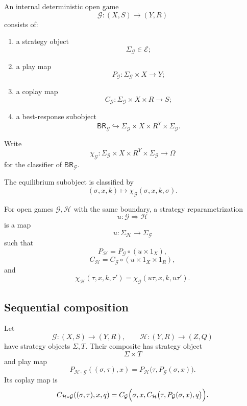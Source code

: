 \begin{definition}
\label{def:internal-deterministic-open-game}
An internal deterministic open game
\[
  \mathcal G:(X,S)\longrightarrow(Y,R)
\]
consists of:
\begin{enumerate}
  \item a strategy object
  \[
    \Sigma_{\mathcal G}\in\mathcal E;
  \]
  \item a play map
  \[
    P_{\mathcal G}:
    \Sigma_{\mathcal G}\times X\to Y;
  \]
  \item a coplay map
  \[
    C_{\mathcal G}:
    \Sigma_{\mathcal G}\times X\times R\to S;
  \]
  \item a best-response subobject
  \[
    \mathsf{BR}_{\mathcal G}
    \hookrightarrow
    \Sigma_{\mathcal G}
    \times X
    \times R^Y
    \times
    \Sigma_{\mathcal G}.
  \]
\end{enumerate}
\end{definition}

Write
\[
  \chi_{\mathcal G}:
  \Sigma_{\mathcal G}
  \times X
  \times R^Y
  \times
  \Sigma_{\mathcal G}
  \longrightarrow
  \Omega
\]
for the classifier of \(\mathsf{BR}_{\mathcal G}\).

The equilibrium subobject is classified by
\[
  (\sigma,x,k)
  \longmapsto
  \chi_{\mathcal G}(\sigma,x,k,\sigma).
\]

\begin{definition}
\label{def:internal-strategy-reparametrization}
For open games \(\mathcal G,\mathcal H\) with the same boundary, a strategy reparametrization
\[
  u:\mathcal G\Longrightarrow\mathcal H
\]
is a map
\[
  u:\Sigma_{\mathcal H}\longrightarrow\Sigma_{\mathcal G}
\]
such that
\[
  P_{\mathcal H}
  =
  P_{\mathcal G}\circ(u\times1_X),
\]
\[
  C_{\mathcal H}
  =
  C_{\mathcal G}
  \circ
  (u\times1_X\times1_R),
\]
and
\[
  \chi_{\mathcal H}(\tau,x,k,\tau')
  =
  \chi_{\mathcal G}(u\tau,x,k,u\tau').
\]
\end{definition}

\subsection{Sequential composition}

Let
\[
  \mathcal G:(X,S)\to(Y,R),
  \qquad
  \mathcal H:(Y,R)\to(Z,Q)
\]
have strategy objects \(\Sigma,T\). Their composite has strategy object
\[
  \Sigma\times T
\]
and play map
\[
  P_{\mathcal H\circ\mathcal G}
  ((\sigma,\tau),x)
  =
  P_{\mathcal H}
  \bigl(
    \tau,
    P_{\mathcal G}(\sigma,x)
  \bigr).
\]
Its coplay map is
\[
\begin{aligned}
  C_{\mathcal H\circ\mathcal G}
  ((\sigma,\tau),x,q)
  =
  C_{\mathcal G}
  \Bigl(
    \sigma,
    x,
    C_{\mathcal H}
    \bigl(
      \tau,
      P_{\mathcal G}(\sigma,x),
      q
    \bigr)
  \Bigr).
\end{aligned}
\]

